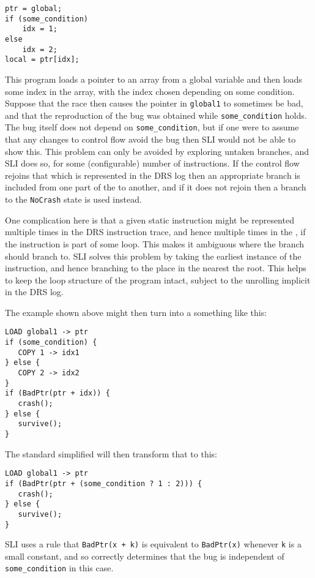 \begin{verbatim}
ptr = global;
if (some_condition)
    idx = 1;
else
    idx = 2;
local = ptr[idx];
\end{verbatim}

This program loads a pointer to an array from a global variable and then loads some index in the array, with the index chosen depending on some condition.
Suppose that the race then causes the pointer in \verb|global1| to sometimes be bad, and that the reproduction of the bug was obtained while \verb|some_condition| holds.
The bug itself does not depend on \verb|some_condition|, but if one were to assume that any changes to control flow avoid the bug then SLI would not be able to show this.
This problem can only be avoided by exploring untaken branches, and SLI does so, for some (configurable) number of instructions.
If the control flow rejoins that which is represented in the DRS log then an appropriate branch is included from one part of the \StateMachine to another, and if it does not rejoin then a branch to the \verb|NoCrash| state is used instead.

One complication here is that a given static instruction might be represented multiple times in the DRS instruction trace, and hence multiple times in the \StateMachine, if the instruction is part of some loop.
This makes it ambiguous where the branch should branch to.
SLI solves this problem by taking the earliest instance of the instruction, and hence branching to the place in the \StateMachine nearest the root.
This helps to keep the loop structure of the program intact, subject to the unrolling implicit in the DRS log.

The example shown above might then turn into a \StateMachine something like this:

\begin{verbatim}
LOAD global1 -> ptr
if (some_condition) {
   COPY 1 -> idx1
} else {
   COPY 2 -> idx2
}
if (BadPtr(ptr + idx)) {
   crash();
} else {
   survive();
}
\end{verbatim}

The standard simplified will then transform that to this:

\begin{verbatim}
LOAD global1 -> ptr
if (BadPtr(ptr + (some_condition ? 1 : 2))) {
   crash();
} else {
   survive();
}
\end{verbatim}

SLI uses a rule that \verb|BadPtr(x + k)| is equivalent to \verb|BadPtr(x)| whenever \verb|k| is a small constant, and so correctly determines that the bug is independent of \verb|some_condition| in this case.

